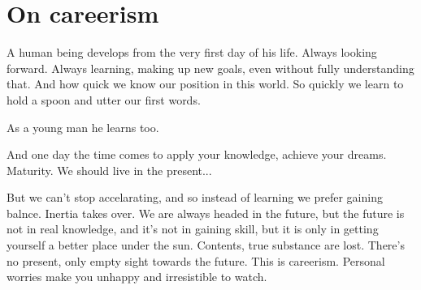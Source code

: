 \chapter{On careerism}

A human being develops from the very first day of his life. Always looking forward. Always learning, making up new goals, even without fully understanding that. And how quick we know our position in this world. So quickly we learn to hold a spoon and utter our first words.

As a young man he learns too.

And one day the time comes to apply your knowledge, achieve your dreams. Maturity. We should live in the present...

But we can't stop accelarating, and so instead of learning we prefer gaining balnce. Inertia takes over. We are always headed in the future, but the future is not in real knowledge, and it's not in gaining skill, but it is only in getting yourself a better place under the sun. Contents, true substance are lost. There's no present, only empty sight towards the future. This is careerism. Personal worries make you unhappy and irresistible to watch.